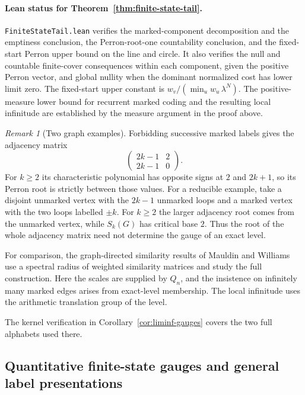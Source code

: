 \documentclass[11pt]{article}
\theoremstyle{definition}
\theoremstyle{remark}
\newtheorem{remark}[theorem]{Remark}
\begin{document}
\paragraph{Lean status for Theorem~\ref{thm:finite-state-tail}.}
\texttt{FiniteStateTail.lean} verifies the marked-component decomposition
and the emptiness conclusion, the Perron-root-one countability conclusion,
and the fixed-start Perron upper bound on the line and circle. It also
verifies the null and countable finite-cover consequences within each
component, given the positive Perron vector, and global nullity when the dominant normalized cost has lower limit zero. The fixed-start upper
constant is $w_v/(\min_u w_u\,\lambda^N)$.
The positive-measure lower bound for recurrent marked coding and the
resulting local infinitude are established by the measure argument
in the proof above.

\begin{remark}[Two graph examples]
Forbidding successive marked labels gives the adjacency matrix
\[
 \begin{pmatrix}2k-1&2\\2k-1&0\end{pmatrix}.
\]
For $k\ge2$ its characteristic polynomial has opposite signs at $2$
and $2k+1$, so its Perron root is strictly between those values.
For a reducible example, take a disjoint unmarked vertex with the
$2k-1$ unmarked loops and a marked vertex with the two loops labelled
$\pm k$. For $k\ge2$ the larger adjacency root comes from the unmarked
vertex, while $S_k(G)$ has critical base $2$. Thus the root of the
whole adjacency matrix need not determine the gauge of an exact level.
\end{remark}

For comparison, the graph-directed similarity results of Mauldin
and Williams \cite[Theorems~3 and~4]{MW} use a spectral radius of weighted
similarity matrices and study the full construction. Here the scales
are supplied by $Q_n$, and the insistence on infinitely many marked
edges arises from exact-level membership. The local infinitude uses
the arithmetic translation group of the level.

The kernel verification in Corollary~\ref{cor:liminf-gauges} covers the two full alphabets used there.

\subsection{Quantitative finite-state gauges and general label presentations}
\end{document}
